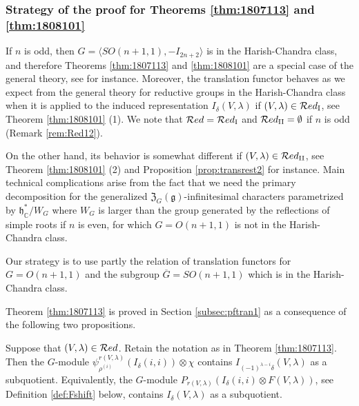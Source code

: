 \subsubsection{Strategy of the proof
 for Theorems \ref{thm:1807113} and \ref{thm:1808101}}
\label{subsec:sketchtrans}
If $n$ is odd,
 then $G=\langle SO(n+1,1), -I_{2n+2} \rangle$ is in the Harish-Chandra class, 
 and therefore Theorems \ref{thm:1807113} and \ref{thm:1808101}
 are a special case of the general theory, 
 see \cite[Chap.~7]{Vogan81} for instance.  
Moreover,
 the translation functor
 behaves
 as we expect from the general theory 
 for reductive groups in the Harish-Chandra class
 when it is applied to the induced representation
 $I_{\delta}(V,\lambda)$
 if $(V,\lambda) \in {\mathcal{R}}ed_{\operatorname{I}}$, 
 see Theorem \ref{thm:1808101} (1).  
We note that ${\mathcal{R}}ed={\mathcal{R}}ed_{\operatorname{I}}$ and ${\mathcal{R}}ed_{\operatorname{I I}}=\emptyset$
 if $n$ is odd
 (Remark \ref{rem:Red12}).  



On the other hand,
 its behavior is somewhat different
 if $(V,\lambda) \in {\mathcal{R}}ed_{\operatorname{I I}}$, 
 see Theorem \ref{thm:1808101} (2)
 and Proposition \ref{prop:transrest2}
 for instance.  
Main technical complications arise from 
 the fact that we need the primary decomposition 
 for the generalized ${\mathfrak{Z}}_G({\mathfrak{g}})$-infinitesimal characters
 parametrized by ${\mathfrak{h}}_{\mathbb{C}}^{\ast}/W_G$
 where $W_G$ is larger than the group 
 generated by the reflections
 of simple roots
 if $n$ is even, 
 for which $G=O(n+1,1)$ is not in the Harish-Chandra class.  



Our strategy is to use partly 
 the relation 
 of translation functors for $G=O(n+1,1)$
 and the subgroup 
 $\overline G=SO(n+1,1)$
 which is in the Harish-Chandra class.  



Theorem \ref{thm:1807113} is proved in Section \ref{subsec:pftran1}
 as a consequence
 of the following two propositions.  

\begin{proposition}
\label{prop:IVsub}
Suppose that $(V,\lambda) \in {\mathcal{R}}ed$.  
Retain the notation as in Theorem \ref{thm:1807113}.  
Then the $G$-module 
 $\psi_{\rho^{(i)}}^{r(V,\lambda)}(I_{\delta}(i,i))\otimes \chi$ contains
 $I_{(-1)^{\lambda-i}\delta}(V,\lambda)$ as a subquotient.   
Equivalently, the $G$-module $P_{r(V,\lambda)}(I_{\delta}(i,i) \otimes F(V,\lambda))$, 
 see Definition \ref{def:Fshift} below, 
 contains $I_{\delta}(V, \lambda)$ as a subquotient.  
\end{proposition}

